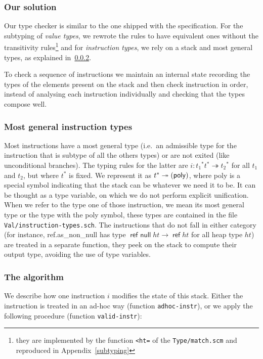 \documentclass[a4paper,11pt]{article}
\DeclareMathOperator{\reft}{\textsf{ref}}
\DeclareMathOperator{\refnullt}{\textsf{ref null}}
\begin{document}
\subsubsection{Our solution}
Our type checker is similar to the one shipped with the specification. For the
subtyping of \emph{value types}, we rewrote the rules to have equivalent ones
without the transitivity rules\footnote{they are implemented by the function
\texttt{<ht=} of the \texttt{Type/match.scm} and reproduced in
Appendix~\ref{subtyping}} and for \emph{instruction types}, we rely on a stack
and most general types, as explained in~\ref{mgt}.

To check a sequence of instructions we maintain an internal state recording the
types of the elements present on the stack and then check instruction in order,
instead of analysing each instruction individually and checking that the types
compose well.

\subsubsection{Most general instruction types}\label{mgt}
Most instructions have a most general type (i.e.\ an admissible type for the
instruction that is subtype of all the others types) or are not exited (like
unconditional branches). The typing rules for the latter are
$i:{t_1}^*t^*\twoheadrightarrow {t_2}^*$ for all $t_1$ and $t_2$, but where
$t^*$ is fixed. We represent it as $t^*\twoheadrightarrow
(\text{\textsf{poly}})$, where \textsf{poly} is a special symbol indicating that
the stack can be whatever we need it to be. It can be thought as a type
variable, on which we do not perform explicit unification. When we refer to the
type one of those instruction, we mean its most general type or the type with
the \textsf{poly} symbol, these types are contained in the file
\texttt{Val/instruction-types.sch}. The instructions that do not fall in either
category (for instance, \textsf{ref.as\_non\_null} has type $\refnullt ht\to
\reft ht$ for all heap type $ht$) are treated in a separate function, they peek
on the stack to compute their output type, avoiding the use of type variables.

\subsubsection{The algorithm}
We describe how one instruction $i$ modifies the state of this stack. Either the
instruction is treated in an ad-hoc way (function \texttt{adhoc-instr}), or we
apply the following procedure (function \texttt{valid-instr}):
\end{document}
